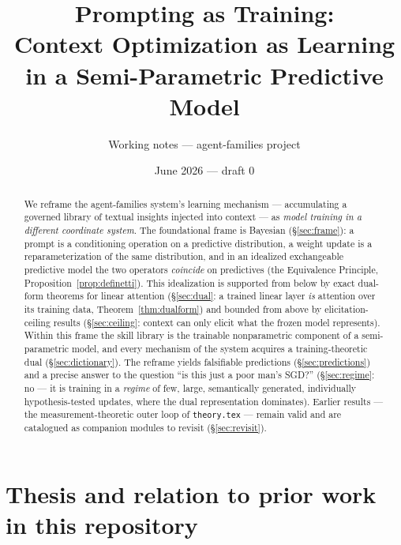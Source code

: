 \documentclass[11pt]{article}
\title{Prompting as Training:\\
\large Context Optimization as Learning in a Semi-Parametric Predictive Model}
\author{Working notes --- agent-families project}
\date{June 2026 --- draft 0}
\theoremstyle{plain}
\theoremstyle{definition}
\theoremstyle{remark}
\begin{document}
\maketitle

\begin{abstract}
We reframe the agent-families system's learning mechanism --- accumulating a
governed library of textual insights injected into context --- as
\emph{model training in a different coordinate system}. The foundational
frame is Bayesian (\S\ref{sec:frame}): a prompt is a conditioning operation
on a predictive distribution, a weight update is a reparameterization of the
same distribution, and in an idealized exchangeable predictive model the two
operators \emph{coincide} on predictives (the Equivalence Principle,
Proposition~\ref{prop:definetti}). This idealization is supported from below
by exact dual-form theorems for linear attention
(\S\ref{sec:dual}: a trained linear layer \emph{is} attention over its
training data, Theorem~\ref{thm:dualform}) and bounded from above by
elicitation-ceiling results (\S\ref{sec:ceiling}: context can only elicit
what the frozen model represents). Within this frame the skill library is
the trainable nonparametric component of a semi-parametric model, and every
mechanism of the system acquires a training-theoretic dual
(\S\ref{sec:dictionary}). The reframe yields falsifiable predictions
(\S\ref{sec:predictions}) and a precise answer to the question ``is this
just a poor man's SGD?'' (\S\ref{sec:regime}: no --- it is training in a
\emph{regime} of few, large, semantically generated, individually
hypothesis-tested updates, where the dual representation dominates).
Earlier results --- the measurement-theoretic outer loop of
\texttt{theory.tex} --- remain valid and are catalogued as companion modules
to revisit (\S\ref{sec:revisit}).
\end{abstract}

\tableofcontents

\section{Thesis and relation to prior work in this repository}
\end{document}
